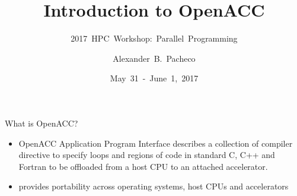 \documentclass[10pt,t]{beamer}
\title{Introduction to OpenACC}
\subtitle{2017~HPC~Workshop:~Parallel~Programming}
\author{\large{Alexander~B.~Pacheco}}
\institute{\href{http://researchcomputing.lehigh.edu}{LTS Research Computing}}
\date{May~31~-~June~1,~2017}
\begin{document}
\begin{frame}
  \titlepage
\end{frame}

\scriptsize
\begin{frame}{ What is OpenACC?}
  \begin{block}{}
    \begin{itemize}
      \item OpenACC Application Program Interface describes a collection of compiler directive to specify loops and regions of code in standard C, C++ and Fortran to be offloaded from a host CPU to an attached accelerator.
      \item provides portability across operating systems, host CPUs and accelerators
    \end{itemize}
  \end{block}
\end{frame}
\end{document}
